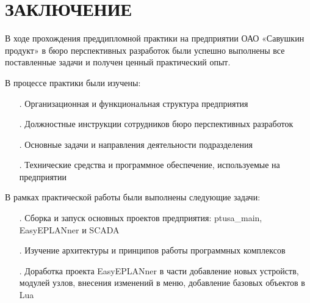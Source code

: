 \sectionbreak \section*{
\gostTitleFont
\redline
ЗАКЛЮЧЕНИЕ
}

\subtitlespace

{\gostFont
\par \redline В ходе прохождения преддипломной практики на предприятии ОАО «Савушкин продукт» в бюро перспективных разработок были успешно выполнены все поставленные задачи и получен ценный практический опыт.

\par \redline В процессе практики были изучены:
\begin{itemize}[leftmargin=2.15cm, labelwidth=0.65cm, labelsep=0.0cm] 

\item[\theitemcntr.] Организационная и функциональная структура предприятия
\addtocounter{itemcntr}{1}

\item[\theitemcntr.] Должностные инструкции сотрудников бюро перспективных разработок
\addtocounter{itemcntr}{1}

\item[\theitemcntr.] Основные задачи и направления деятельности подразделения
\addtocounter{itemcntr}{1}

\item[\theitemcntr.] Технические средства и программное обеспечение, используемые на предприятии
\addtocounter{itemcntr}{1}

\setcounter{itemcntr}{1}
\end{itemize}

\par \redline В рамках практической работы были выполнены следующие задачи:
\begin{itemize}[leftmargin=2.15cm, labelwidth=0.65cm, labelsep=0.0cm] 

\item[\theitemcntr.] Сборка и запуск основных проектов предприятия: ptusa\_main, EasyEPLANner и SCADA
\addtocounter{itemcntr}{1}

\item[\theitemcntr.] Изучение архитектуры и принципов работы программных комплексов
\addtocounter{itemcntr}{1}

\item[\theitemcntr.] Доработка проекта EasyEPLANner в части добавление новых устройств, модулей узлов, внесения изменений в меню, добавление базовых объектов в Lua
\addtocounter{itemcntr}{1}


\end{itemize}}
